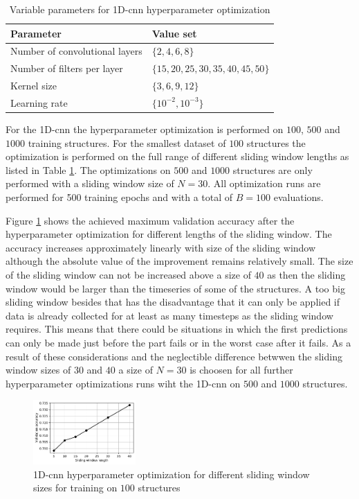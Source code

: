 \documentclass[conference]{IEEEtran}
\begin{document}
\begin{table}[htp]
	\centering
	\caption{Variable parameters for 1D-\gls{cnn} hyperparameter optimization}
	\label{tab:variable_parameters_cnn_optimization}
	\begin{tabular}{ll}
		\textbf{Parameter} & \textbf{Value set} \\
		\hline
		Number of convolutional layers & $ \{2, 4, 6, 8\} $ \\
		Number of filters per layer & $ \{15, 20, 25, 30, 35, 40, 45, 50\} $ \\
		Kernel size & $ \{3, 6, 9, 12\} $ \\
		Learning rate & $ \{10^{-2}, 10^{-3}\} $
	\end{tabular}
\end{table}

For the 1D-\gls{cnn} the hyperparameter optimization is performed on $ 100 $, $ 500 $ and $ 1000 $  training structures. For the smallest dataset of $ 100 $ structures the optimization is performed on the full range of different sliding window lengths as listed in Table \ref{tab:variable_parameters_cnn_optimization}. The optimizations on $ 500 $ and $ 1000 $ structures are only performed with a sliding window size of $ N = 30 $. All optimization runs are performed for 500 training epochs and with a total of $ B = 100 $ evaluations.

Figure \ref{fig:influence_sequence_length_cnn} shows the achieved maximum validation accuracy after the hyperparameter optimization for different lengths of the sliding window. The accuracy increases approximately linearly with size of the sliding window although the absolute value of the improvement remains relatively small. The size of the sliding window can not be increased above a size of $ 40 $ as then the sliding window would be larger than the timeseries of some of the structures. A too big sliding window besides that has the disadvantage that it can only be applied if data is already collected for at least as many timesteps as the sliding window requires. This means that there could be situations in which the first predictions can only be made just before the part fails or in the worst case after it fails. As a result of these considerations and the neglectible difference betwwen the sliding window sizes of $ 30 $ and $ 40 $ a size of $ N = 30 $ is choosen for all further hyperparameter optimizations runs wiht the 1D-\gls{cnn} on $ 500 $ and $ 1000 $ structures.

\begin{figure}[htp]
	\centering
	\includegraphics[width=0.35\textwidth]{python/influence_sequence_length_cnn.pdf}
	\caption{1D-\gls{cnn} hyperparameter optimization for different sliding window sizes for training on $ 100 $ structures}
	\label{fig:influence_sequence_length_cnn}
\end{figure}
\end{document}
